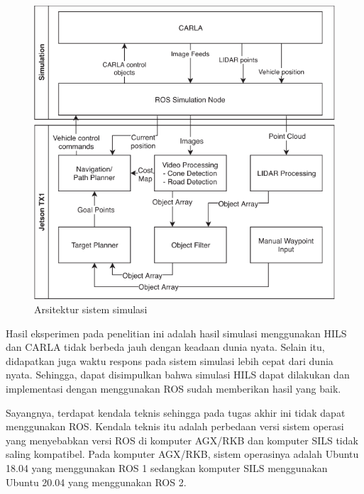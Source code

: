 \begin{figure}[h!]
	\centering
	\includegraphics[width=1.0\textwidth]{resources/chapter-2/carla-jetson-arch.png}
	\caption{Arsitektur sistem simulasi \parencite{brogle_CarlaHILS}}
	\label{chapter-2-carla-jetson-arch}
\end{figure}

Hasil eksperimen pada penelitian ini adalah hasil simulasi menggunakan HILS dan
CARLA tidak berbeda jauh dengan keadaan dunia nyata. Selain itu, didapatkan juga
waktu respons pada sistem simulasi lebih cepat dari dunia nyata. Sehingga, dapat
disimpulkan bahwa simulasi HILS dapat dilakukan dan implementasi dengan
menggunakan ROS sudah memberikan hasil yang baik.

Sayangnya, terdapat kendala teknis sehingga pada tugas akhir ini tidak dapat
menggunakan ROS. Kendala teknis itu adalah perbedaan versi sistem operasi yang
menyebabkan versi ROS di komputer AGX/RKB dan komputer SILS tidak saling
kompatibel. Pada komputer AGX/RKB, sistem operasinya adalah Ubuntu 18.04 yang
menggunakan ROS 1 sedangkan komputer SILS menggunakan Ubuntu 20.04 yang
menggunakan ROS 2.
